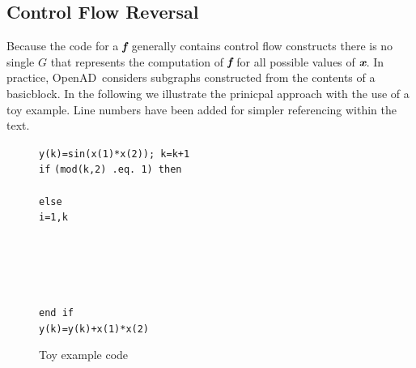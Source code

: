 \documentclass[11pt]{article}
\newcommand{\basicblock}{basicblock}
\newcommand{\OpenAD}{OpenAD}
\newcommand{\bmf}{\mbox{\bf\em f}}
\newcommand{\bmx}{\mbox{\bf\em x}}
\begin{document}
\subsection{Control Flow Reversal} \label{ssec:cfReversal}
Because the code for a $\bmf$ generally contains control flow constructs there is no 
single $G$ that represents the computation of $\bmf$ for all possible values of $\bmx$.
In practice, \OpenAD\ considers subgraphs constructed 
from the contents of a \basicblock.
In the following we illustrate the prinicpal approach with the use 
of a toy example.  
Line numbers have been added for simpler referencing within the text.
\begin{figure}
\begin{tabbing}
\hspace{.6cm}{\footnotesize \bf 01}\hspace{.5cm} {\tt y(k)=sin(x(1)*x(2)); k=k+1} \\
\hspace{.6cm}{\footnotesize \bf 02}\hspace{.5cm} {\tt if} \={\tt (mod(k,2) .eq. 1) then } \\
\hspace{.6cm}{\footnotesize \bf 03}\hspace{.5cm}   \\
\hspace{.6cm}{\footnotesize \bf 04}\hspace{.5cm} {\tt else } \\
\hspace{.6cm}{\footnotesize \bf 05}\hspace{.5cm}  \={\tt i=1,k } \\
\hspace{.6cm}{\footnotesize \bf 06}\hspace{.5cm} \> \\
\hspace{.6cm}{\footnotesize \bf 07}\hspace{.5cm} \> \\
\hspace{.6cm}{\footnotesize \bf 08}\hspace{.5cm} \> \\
\hspace{.6cm}{\footnotesize \bf 09}\hspace{.5cm} \> \\
\hspace{.6cm}{\footnotesize \bf 10}\hspace{.5cm}  \\
\hspace{.6cm}{\footnotesize \bf 11}\hspace{.5cm} {\tt end if } \\
\hspace{.6cm}{\footnotesize \bf 12}\hspace{.5cm} {\tt y(k)=y(k)+x(1)*x(2) } 
\end{tabbing}
\caption{Toy example code}\label{fig:toy}
\end{figure}
\end{document}
